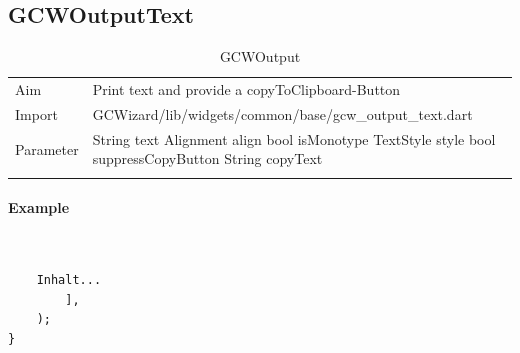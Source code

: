 \subsection{GCWOutputText}
\label{fig: GCWOutputText}
\begin{table}[H]
    \begin{tabular}[h]{p{2cm}p{9cm}}
        \caption{GCWOutput}
        Aim       & Print text and provide a copyToClipboard-Button\\
        Import    & GCWizard/lib/widgets/common/base/gcw\_output\_text.dart\\
        Parameter & String text\newline
                    Alignment align\newline
                    bool isMonotype\newline
                    TextStyle style\newline
                    bool suppressCopyButton\newline
                    String copyText\\
        \label{tab:GCWOutputText}
    \end{tabular}
\end{table}
\paragraph*{Example} \,
\begin{lstlisting}
    Inhalt...
        ],
    );
}
\end{lstlisting}
\label{fig: ExampleGCWOutputText}

\newpage
